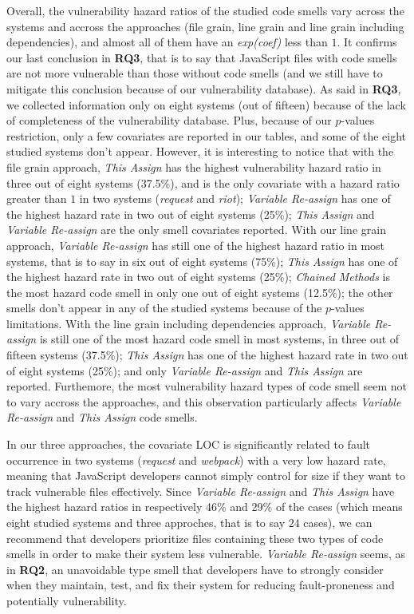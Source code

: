 {Overall, the vulnerability hazard ratios of the studied code smells vary across the systems and accross the approaches (file grain, line grain and line grain including dependencies), and almost all of them have an \textsl{exp(coef)} less than $1$. It confirms our last conclusion in \textbf{RQ3}, that is to say that JavaScript files with code smells are not more vulnerable than those without code smells (and we still have to mitigate this conclusion because of our vulnerability database). As said in \textbf{RQ3}, we collected information only on eight systems (out of fifteen) because of the lack of completeness of the vulnerability database. Plus, because of our $p$-values restriction, only a few covariates are reported in our tables, and some of the eight studied systems don't appear. However, it is interesting to notice that with the file grain approach, \textsl{This Assign} has the highest vulnerability hazard ratio in three out of eight systems (37.5\%), and is the only covariate with a hazard ratio greater than $1$ in two systems (\textsl{request} and \textsl{riot}); \textsl{Variable Re-assign} has one of the highest hazard rate in two out of eight systems (25\%); \textsl{This Assign} and \textsl{Variable Re-assign} are the only smell covariates reported. With our line grain approach, \textsl{Variable Re-assign} has still one of the highest hazard ratio in most systems, that is to say in six out of eight systems (75\%); \textsl{This Assign} has one of the highest hazard rate in two out of eight systems (25\%); \textsl{Chained Methods} is the most hazard code smell in only one out of eight systems (12.5\%); the other smells don't appear in any of the studied systems because of the $p$-values limitations. With the line grain including dependencies approach, \textsl{Variable Re-assign} is still one of the most hazard code smell in most systems, in three out of fifteen systems (37.5\%); \textsl{This Assign}  has one of the highest hazard rate in two out of eight systems (25\%); and only \textsl{Variable Re-assign} and \textsl{This Assign} are reported. Furthemore, the most vulnerability hazard types of code smell seem not to vary accross the approaches, and this observation particularly affects \textsl{Variable Re-assign} and \textsl{This Assign} code smells.

In our three approaches, the covariate LOC is significantly related to fault occurrence in two systems (\textsl{request} and \textsl{webpack}) with a very low hazard rate, meaning that JavaScript developers cannot simply control for size if they want to track vulnerable files effectively. Since \textsl{Variable Re-assign} and \textsl{This Assign} have the highest hazard ratios in respectively 46\% and 29\% of the cases (which means eight studied systems and three approches, that is to say $24$ cases), we can recommend that developers prioritize files containing these two types of code smells in order to make their system less vulnerable. \textsl{Variable Re-assign} seems, as in \textbf{RQ2}, an unavoidable type smell that developers have to strongly consider when they maintain, test, and fix their system for reducing fault-proneness and potentially vulnerability.

}

